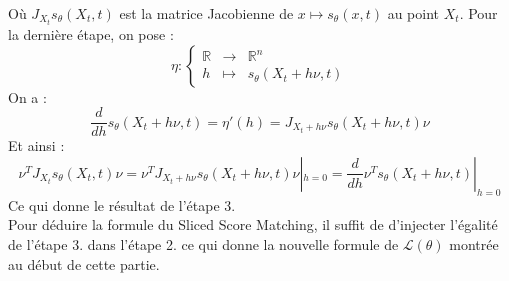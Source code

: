\documentclass[a4paper, 12pt,french]{report}
\begin{document}
Où $J_{X_t}s_\theta(X_t,t)$ est la matrice Jacobienne de $x \mapsto s_\theta(x,t)$ au point $X_t$.
Pour la dernière étape, on pose : 
$$ 
\eta : 
\left \{
\begin{array}{rcl}
\mathbb{R} & \longrightarrow & \mathbb{R}^n  \\
h & \longmapsto & s_\theta(X_t+h\nu,t) 
\end{array}
\right.
$$
On a : 
$$ \frac{d}{dh}s_\theta(X_t+h\nu,t)=\eta'(h)
=J_{X_t+h\nu}s_\theta(X_t+h\nu,t)\nu
$$
Et ainsi : 
$$
\nu^TJ_{X_t}s_\theta(X_t,t)\nu=
\nu^TJ_{X_t+h\nu}s_\theta(X_t+h\nu,t)\nu|_{h=0}=
\frac{d}{dh}\nu^Ts_\theta(X_t+h\nu,t)|_{h=0}
$$
Ce qui donne le résultat de l'étape 3. \\
Pour déduire la formule du Sliced Score Matching, il suffit de d'injecter l'égalité de l'étape 3. dans l'étape 2. ce qui donne la nouvelle formule de $\mathcal{L}(\theta)$ montrée au début de cette partie.
\end{document}
